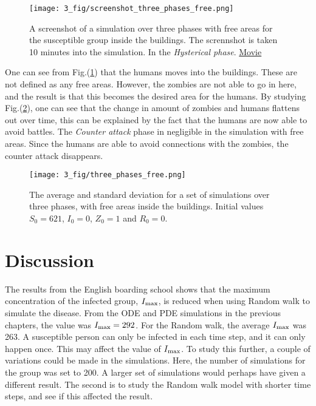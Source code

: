 \documentclass[%
twoside,                 %
final,                   %
chapterprefix=true,      %
open=right               %
10pt]{book}
\begin{document}
\vspace{3mm}




\vspace{3mm}




\begin{figure}[ht]
  \centerline{\texttt{[image: 3\_fig/screenshot\_three\_phases\_free.png]}}
  \caption{
  \label{fig:screenshot_three_phases_free} A screenshot of a simulation over three phases with free areas for the susceptible group inside the buildings. The scrennshot is taken 10 minutes into the simulation. In the \emph{Hysterical phase}. \href{{https://torbjornseland.github.io/master}}{Movie}
  }
\end{figure}


One can see from Fig.(\ref{fig:screenshot_three_phases_free}) that the humans moves into the buildings. These are not defined as any free areas. However, the zombies are not able to go in here, and the result is that this becomes the desired area for the humans. By studying Fig.(\ref{fig:three_phases_free}), one can see that the change in amount of zombies and humans flattens out over time, this can be explained by the fact that the humans are now able to avoid battles. The \emph{Counter attack} phase in negligible in the simulation with free areas. Since the humans are able to avoid connections with the zombies, the counter attack disappears.  


\begin{figure}[ht]
  \centerline{\texttt{[image: 3\_fig/three\_phases\_free.png]}}
  \caption{
  \label{fig:three_phases_free} The average and standard deviation for a set of simulations over three phases, with free areas inside the buildings. Initial values $S_0 = 621$, $I_0 = 0$, $Z_0=1$ and $R_0=0$.
  }
\end{figure}






\section{Discussion}
The results from the English boarding school shows that the maximum concentration of the infected group, $I_{\textrm{max}}$, is reduced when using Random walk to simulate the disease. From the ODE and PDE simulations in the previous chapters, the value was $I_{\textrm{max}}=292$. For the Random walk, the average $I_{\textrm{max}}$ was 263. A susceptible person can only be infected in each time step, and it can only happen once. This may affect the value of $I_{\textrm{max}}$. To study this further, a couple of variations could be made in the simulations. Here, the number of simulations for the group was set to 200. A larger set of simulations would perhaps have given a different result. The second is to study the Random walk model with shorter time steps, and see if this affected the result.
\end{document}

